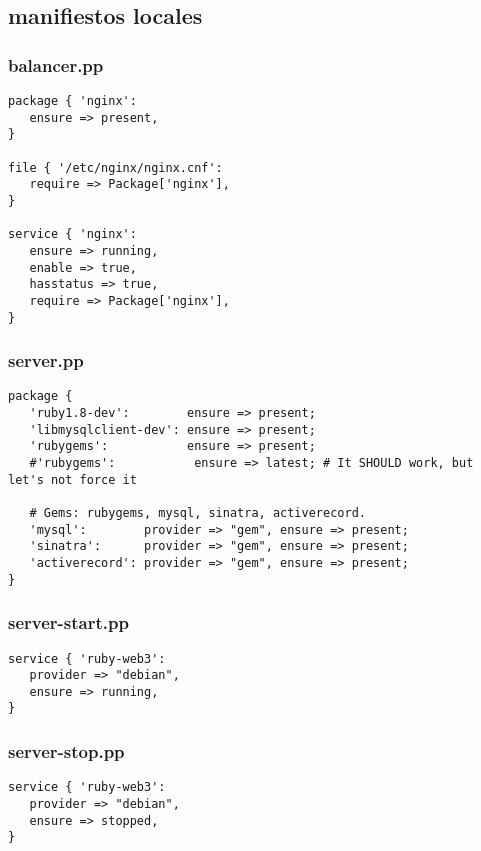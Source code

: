 \subsection{manifiestos locales}


\subsubsection{balancer.pp}


\begin{lstlisting}
package { 'nginx':
   ensure => present,
}

file { '/etc/nginx/nginx.cnf':
   require => Package['nginx'],
}

service { 'nginx':
   ensure => running,
   enable => true,
   hasstatus => true,
   require => Package['nginx'],
}
\end{lstlisting}


\subsubsection{server.pp}

\begin{lstlisting}
package {
   'ruby1.8-dev':        ensure => present;
   'libmysqlclient-dev': ensure => present;
   'rubygems':           ensure => present;
   #'rubygems':           ensure => latest; # It SHOULD work, but let's not force it
   
   # Gems: rubygems, mysql, sinatra, activerecord.
   'mysql':        provider => "gem", ensure => present;
   'sinatra':      provider => "gem", ensure => present;
   'activerecord': provider => "gem", ensure => present;
}
\end{lstlisting}


\subsubsection{server-start.pp}


\begin{lstlisting}
service { 'ruby-web3':
   provider => "debian",
   ensure => running,
}
\end{lstlisting}


\subsubsection{server-stop.pp}


\begin{lstlisting}
service { 'ruby-web3':
   provider => "debian",
   ensure => stopped,
}

\end{lstlisting}


